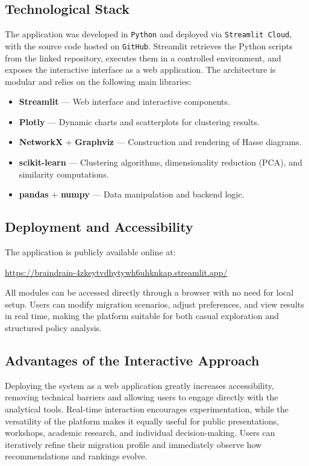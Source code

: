 \documentclass[11pt]{article}
\begin{document}
\subsection{Technological Stack}

The application was developed in \texttt{Python} and deployed via \texttt{Streamlit Cloud}, with the source code hosted on \texttt{GitHub}. 
Streamlit retrieves the Python scripts from the linked repository, executes them in a controlled environment, and exposes the interactive interface as a web application. 
The architecture is modular and relies on the following main libraries:
\begin{itemize}
\item \textbf{Streamlit} — Web interface and interactive components.
\item \textbf{Plotly} — Dynamic charts and scatterplots for clustering results.
\item \textbf{NetworkX} + \textbf{Graphviz} — Construction and rendering of Hasse diagrams.
\item \textbf{scikit-learn} — Clustering algorithms, dimensionality reduction (PCA), and similarity computations.
\item \textbf{pandas} + \textbf{numpy} — Data manipulation and backend logic.
\end{itemize}


\subsection{Deployment and Accessibility}

\noindent
The application is publicly available online at:
\begin{center}
\url{https://braindrain-4zkeytvdhytywh6uhknkap.streamlit.app/}
\end{center}
All modules can be accessed directly through a browser with no need for local setup. Users can modify migration scenarios, adjust preferences, and view results in real time, making the platform suitable for both casual exploration and structured policy analysis.

\subsection{Advantages of the Interactive Approach}

\noindent
Deploying the system as a web application greatly increases accessibility, removing technical barriers and allowing users to engage directly with the analytical tools. Real-time interaction encourages experimentation, while the versatility of the platform makes it equally useful for public presentations, workshops, academic research, and individual decision-making. Users can iteratively refine their migration profile and immediately observe how recommendations and rankings evolve.
\end{document}
